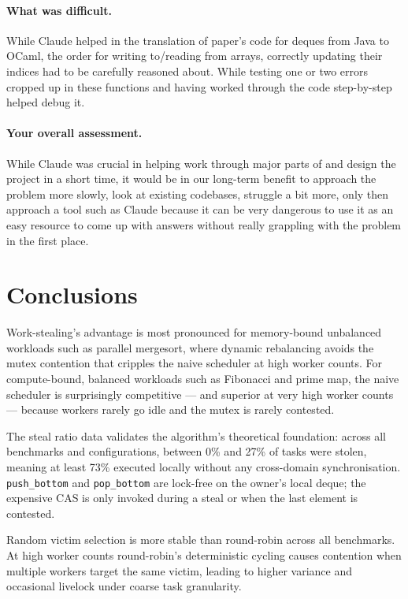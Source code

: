 \documentclass[11pt,a4paper]{article}
\begin{document}
\paragraph{What was difficult.}
While Claude helped in the translation of paper's code for deques from Java to
OCaml, the order for writing to/reading from arrays, correctly updating their
indices had to be carefully reasoned about. While testing one or two errors
cropped up in these functions and having worked through the code step-by-step
helped debug it.

\paragraph{Your overall assessment.}
While Claude was crucial in helping work through major parts of and design the
project in a short time, it would be in our long-term benefit to approach the
problem more slowly, look at existing codebases, struggle a bit more, only then
approach a tool such as Claude because it can be very dangerous to use it as an
easy resource to come up with answers without really grappling with the problem
in the first place.

\section{Conclusions}
\label{sec:conclusions}

Work-stealing's advantage is most pronounced for memory-bound
unbalanced workloads such as parallel mergesort, where dynamic rebalancing
avoids the mutex contention that cripples the naive scheduler at high worker
counts. For compute-bound, balanced workloads such as Fibonacci and prime map,
the naive scheduler is surprisingly competitive — and superior at very high
worker counts — because workers rarely go idle and the mutex is rarely contested.

The steal ratio data validates the algorithm's theoretical foundation: across
all benchmarks and configurations, between 0\% and 27\% of tasks were stolen,
meaning at least 73\% executed locally without any cross-domain synchronisation.
\texttt{push\_bottom} and \texttt{pop\_bottom} are lock-free on the owner's
local deque; the expensive CAS is only invoked during a steal or when the last
element is contested.

Random victim selection is more stable than round-robin across all benchmarks.
At high worker counts round-robin's deterministic cycling causes contention when
multiple workers target the same victim, leading to higher variance and
occasional livelock under coarse task granularity.
\end{document}
